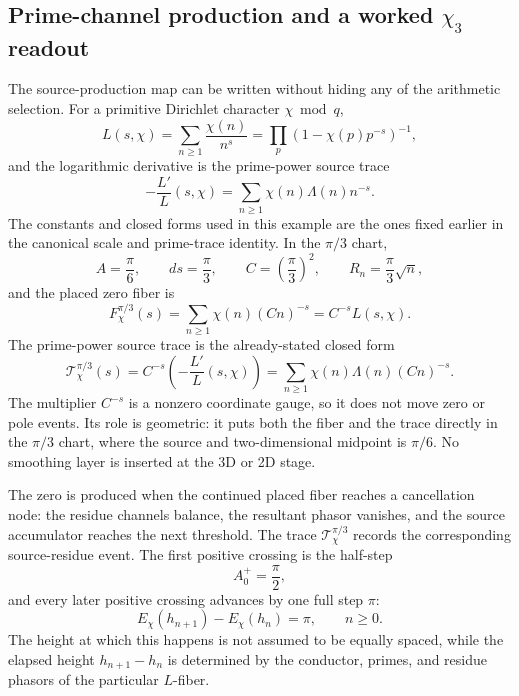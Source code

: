 \documentclass[11pt]{article}
\begin{document}
\subsection{Prime-channel production and a worked \texorpdfstring{$\chi_3$}{chi3} readout}

The source-production map can be written without hiding any of the arithmetic
selection.  For a primitive Dirichlet character $\chi\bmod q$,
\[
  L(s,\chi)=\sum_{n\ge1}\frac{\chi(n)}{n^s}
  =\prod_p(1-\chi(p)p^{-s})^{-1},
\]
and the logarithmic derivative is the prime-power source trace
\[
  -\frac{L'}{L}(s,\chi)
  =\sum_{n\ge1}\chi(n)\Lambda(n)n^{-s}.
\]
The constants and closed forms used in this example are the ones fixed earlier
in the canonical scale and prime-trace identity.  In the $\pi/3$ chart,
\[
  A=\frac{\pi}{6},\qquad ds=\frac{\pi}{3},\qquad
  C=\left(\frac{\pi}{3}\right)^2,\qquad R_n=\frac{\pi}{3}\sqrt n,
\]
and the placed zero fiber is
\[
  F_\chi^{\pi/3}(s)
  =
  \sum_{n\ge1}\chi(n)(Cn)^{-s}
  =
  C^{-s}L(s,\chi).
\]
The prime-power source trace is the already-stated closed form
\[
  \mathcal T_\chi^{\pi/3}(s)
  =
  C^{-s}\left(-\frac{L'}{L}(s,\chi)\right)
  =
  \sum_{n\ge1}\chi(n)\Lambda(n)(Cn)^{-s}.
\]
The multiplier $C^{-s}$ is a nonzero coordinate gauge, so it does not move
zero or pole events.  Its role is geometric: it puts both the fiber and the
trace directly in the $\pi/3$ chart, where the source and two-dimensional
midpoint is $\pi/6$.  No smoothing layer is inserted at the 3D or 2D stage.

The zero is produced when the continued placed fiber reaches a cancellation
node: the residue channels balance, the resultant phasor vanishes, and the
source accumulator reaches the next threshold.  The trace
$\mathcal T_\chi^{\pi/3}$ records the corresponding source-residue event.  The
first positive crossing is the half-step
\[
  A_0^+=\frac{\pi}{2},
\]
and every later positive crossing advances by one full step $\pi$:
\[
  E_\chi(h_{n+1})-E_\chi(h_n)=\pi,
  \qquad n\ge0 .
\]
The height at which this happens is not assumed to be equally spaced,
while the elapsed height $h_{n+1}-h_n$ is determined by the conductor, primes,
and residue phasors of the particular $L$-fiber.
\end{document}
